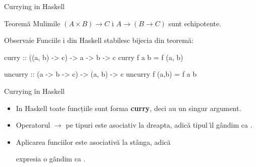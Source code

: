 \documentclass[xcolor=pdftex,romanian,colorlinks]{beamer}
\begin{document}
  \begin{frame}[fragile]{Currying in Haskell}
  \begin{block}{Teorem\u a}
  Mul\ts imile $(A\times B)\to C$ \sh i $A\to (B\to C)$ sunt echipotente.
  \end{block}

  \begin{block}{Observa\ts ie}
  Func\ts iile  \sh i  din Haskell stabilesc bijec\ts ia din teorem\u a:
  \begin{asciihs}
  curry :: ((a, b) -> c) -> a -> b -> c
  curry f a b = f (a, b)

  uncurry :: (a -> b -> c) -> (a, b) -> c
  uncurry f (a,b) = f a b
  \end{asciihs}
  \end{block}
  
  \end{frame}
 
%  
%  
%  
%  
%  
%  
%  
  
  
  
  
  \begin{frame}{Currying în Haskell}
 
  
  \begin{itemize}
  \item In Haskell toate funcțiile sunt forma {\bf curry}, deci au un singur argument.
  \medskip
  
  \item Operatorul  $\to$ pe tipuri este asociativ la dreapta, adic\u a tipul
     \^{\i}l g\^ andim ca
  .
  
  \medskip
  
  \item  Aplicarea func\ts iilor este  asociativ\u a la st\^ anga, adic\u a
  
  expresia  o  g\^ andim ca
  .
  \end{itemize}
  \end{frame}
  
 
\end{document}
